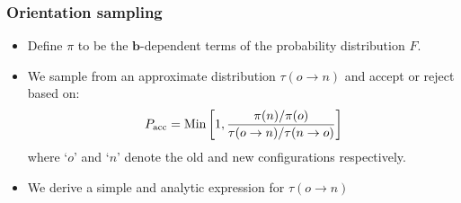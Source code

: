 \documentclass[xcolor=svgnames]{beamer}
\DeclareRobustCommand{\mbf}[1]{{\boldsymbol {#1}}}
\begin{document}
        \begin{frame}
            \frametitle{Orientation sampling}
            \begin{itemize}
                \item Define $\pi$ to be the $\mbf{b}$-dependent terms of the probability distribution $F$.
                \item We sample from an approximate distribution $\tau (o \to n)$ and accept or reject based on:
                \begin{equation*}
                    \label{eq:Pacc}
                    P_{\rm acc} = \text{Min} \left[1, \frac{\pi(n)/\pi(o)}{\tau (o \to n)/\tau (n \to o)} \right]
                \end{equation*}
                where `$o$' and `$n$' denote the old and new configurations respectively.
                \item We derive a simple and analytic expression for $\tau (o \to n)$
            \end{itemize}
        \end{frame}
\end{document}
